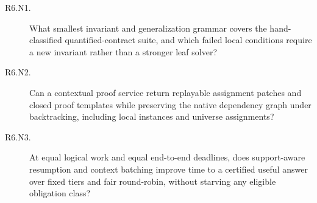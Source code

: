 \begin{description}
\item[R6.N1.] What smallest invariant and generalization grammar covers the hand-classified quantified-contract suite, and which failed local conditions require a new invariant rather than a stronger leaf solver?
\item[R6.N2.] Can a contextual proof service return replayable assignment patches and closed proof templates while preserving the native dependency graph under backtracking, including local instances and universe assignments?
\item[R6.N3.] At equal logical work and equal end-to-end deadlines, does support-aware resumption and context batching improve time to a certified useful answer over fixed tiers and fair round-robin, without starving any eligible obligation class?
\end{description}

